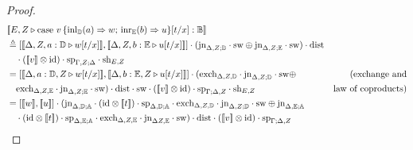 \documentclass[10pt,a4paper]{amsart}
\theoremstyle{definition}
\theoremstyle{definition}
\theoremstyle{definition}
\theoremstyle{definition}
\theoremstyle{definition}
\theoremstyle{definition}
\begin{document}
\begin{proof}
 

\begin{align*}
  &[\![E, Z \vljud \text{case } v \,  \{\text{inl}_{\typeD} (a) \Rightarrow w ;\, \text{inr}_{\typeE} (b) \Rightarrow u\} [t/x]: \typeB]\!] \\
  & \triangleq \left[[\![ \Delta  , Z ,  a:\typeD \vljud w[t/x] ]\!] ,[\![ \Delta, Z, b:\typeE \vljud u[t/x]  ]\!] \right] \comp (\text{jn}_{ \Delta,Z;\typeD} \comp \sw \oplus \text{jn}_{ \Delta,Z;\typeE} \comp \sw) \comp \dist   \\
  &  \hspace{10pt}  \comp ([\![ v ]\!]   \otimes \text{id}) \comp \text{sp}_{\Gamma, Z;\Delta} \comp \text{sh}_{E,Z} \hspace{10pt} \\
  & =  \left[[\![ \Delta  ,   a:\typeD, Z \vljud w[t/x] ]\!] ,[\![ \Delta, b:\typeE, Z \vljud u[t/x]  ]\!] \right] \comp ( \text{exch}_{\Delta,Z,\typeD} \comp \text{jn}_{ \Delta,Z;\typeD} \comp \sw \oplus     & {(\text{exchange and}} \\
  & \hspace{10pt} \text{exch}_{\Delta,Z,\typeE}  \comp \text{jn}_{ \Delta,Z;\typeE} \comp \sw)  \comp \dist \comp \sw \comp ([\![v]\!] \otimes \text{id})  \comp \text{sp}_{\Gamma; \Delta, Z} \comp \text{sh}_{E,Z} & { \text{law of coproducts})}   \\
  & =   \left[[\![w ]\!] ,[\![ u]\!] \right] \comp ( \text{jn}_{\Delta,\typeD; \typeA} \comp (\text{id} \otimes [\![t]\!] ) \comp \text{sp}_{\Delta,\typeD; \typeA} \comp  \text{exch}_{\Delta, Z,\typeD}  \comp \text{jn}_{\Delta, Z; \typeD} \comp \sw  \oplus  \text{jn}_{\Delta,\typeE; \typeA}    \\
  & \hspace{10pt}  \comp (\text{id} \otimes [\![ t]\!] ) \comp \text{sp}_{\Delta,\typeE; \typeA}  \comp \text{exch}_{\Delta, Z,\typeE} \comp\text{jn}_{\Delta Z, \typeE} \comp \sw ) \comp \dist  \comp ([\![v]\!] \otimes \text{id})  \comp \text{sp}_{\Gamma; \Delta, Z}   \\

\end{align*}
\end{proof}
\end{document}
